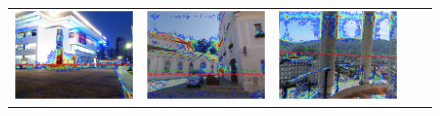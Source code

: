 \begin{figure}
\begin{tabular}{@{}c@{}c@{}c@{}c@{}c@{}}
\includegraphics[width=\sgbpwidth\linewidth]{figures/nn_analysis/sgbp/pano_ayflzrhzcccird_jpg-4.png} &
\includegraphics[width=\sgbpwidth\linewidth]{figures/nn_analysis/sgbp/pano_ayfpxlgzfcixnm_jpg-6.png} &
\includegraphics[width=\sgbpwidth\linewidth]{figures/nn_analysis/sgbp/pano_addontedcyafqk_jpg-6.png} &

\end{tabular}
\end{figure}
